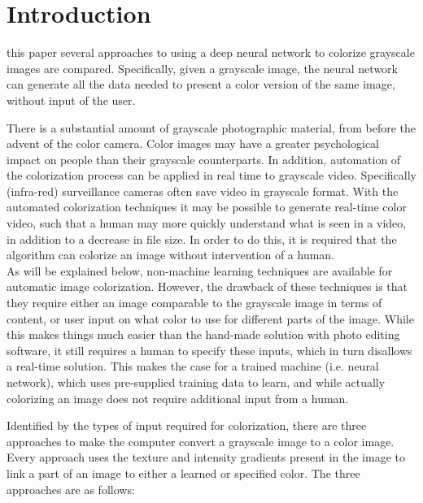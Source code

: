 \section{Introduction}\label{sec:intro}

%
%
%


 this paper several approaches to using a deep neural network to colorize grayscale images are compared. Specifically, given a grayscale image, the neural network can generate all the data needed to present a color version of the same image, without input of the user. 

There is a substantial amount of grayscale photographic material, from before the advent of the color camera. Color images may have a greater psychological impact on people than their grayscale counterparts.
In addition, automation of the colorization process can be applied in real time to grayscale video. Specifically (infra-red) surveillance cameras often save video in grayscale format. With the automated colorization techniques it may be possible to generate real-time color video, such that a human may more quickly understand what is seen in a video, in addition to a decrease in file size. In order to do this, it is required that the algorithm can colorize an image without intervention of a human.\\

As will be explained below, non-machine learning techniques are available for automatic image colorization. However, the drawback of these techniques is that they require either an image comparable to the grayscale image in terms of content, or user input on what color to use for different parts of the image. 
While this makes things much easier than the hand-made solution with photo editing software, it still requires a human to specify these inputs, which in turn disallows a real-time solution. This makes the case for a trained machine (i.e. neural network), which uses pre-supplied training data to learn, and while actually colorizing an image does not require additional input from a human.

Identified by the types of input required for colorization, there are three approaches to make the computer convert a grayscale image to a color image. Every approach uses the texture and intensity gradients present in the image to link a part of an image to either a learned or specified color. The three approaches are as follows:

